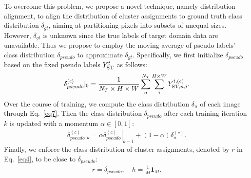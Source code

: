 \documentclass[10pt,twocolumn,letterpaper]{article}
\begin{document}
	To overcome this problem, we propose a novel technique, namely distribution alignment, to align the distribution of cluster assignments to ground truth class distribution $\delta_{gt}$, aiming at partitioning pixels into subsets of unequal sizes. However, $\delta_{gt}$ is unknown since the true labels of target domain data are unavailable. Thus we propose to employ the moving average of pseudo labels' class distribution ${\delta}_{pseudo}$ to approximate ${\delta}_{gt}$. Specifically, we first initialize $\delta_{pseudo}$ based on the fixed pseudo labels $Y^t_{\rm ST}$ as follows:
	\begin{align}
		\delta_{pseudo}^{(c)}|_0=\frac{1}{N_T\times H\times W}\sum_{n}^{N_T}\sum_{i}^{H\times W}{ Y^{t,(c)}_{{\rm ST}, n,i}}.
	\end{align}
	Over the course of training, we compute the class distribution $\delta_n$ of each image through Eq.~\ref{eq7}. Then the class distribution $\delta_{pseudo}$ after each training iteration $k$ is updated with a momentum $\alpha\in[0,1]$: 
	\begin{align}
		{\delta}_{pseudo}^{(c)}|_{k} = \alpha {\delta}_{pseudo}^{(c)}|_{k-1}+(1-\alpha){\delta}_{n}^{(c)}.
	\end{align}
	Finally, we enforce the class distribution of cluster assignments, denoted by $r$ in Eq.~\ref{eq4}, to be close to ${\delta}_{pseudo}$:
	\begin{align}
		r={\delta}_{pseudo}, \quad h=\frac{1}{M}\mathbf{1}_M.
	\end{align}
	
\end{document}
